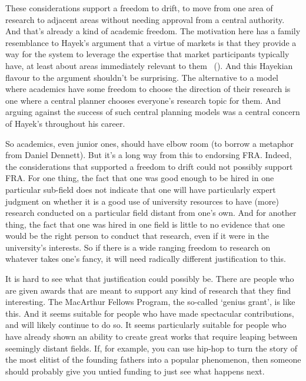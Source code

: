 \documentclass[
  10pt,
  letterpaper,
  DIV=11,
  numbers=noendperiod,
  twoside]{scrartcl}
\begin{document}
These considerations support a freedom to drift, to move from one area
of research to adjacent areas without needing approval from a central
authority. And that's already a kind of academic freedom. The motivation
here has a family resemblance to Hayek's argument that a virtue of
markets is that they provide a way for the system to leverage the
expertise that market participants typically have, at least about areas
immediately relevant to them ~().
And this Hayekian flavour to the argument shouldn't be surprising. The
alternative to a model where academics have some freedom to choose the
direction of their research is one where a central planner chooses
everyone's research topic for them. And arguing against the success of
such central planning models was a central concern of Hayek's throughout
his career.

So academics, even junior ones, should have elbow room (to borrow a
metaphor from Daniel Dennett). But it's a long way from this to
endorsing FRA. Indeed, the considerations that supported a freedom to
drift could not possibly support FRA. For one thing, the fact that one
was good enough to be hired in one particular sub-field does not
indicate that one will have particularly expert judgment on whether it
is a good use of university resources to have (more) research conducted
on a particular field distant from one's own. And for another thing, the
fact that one was hired in one field is little to no evidence that one
would be the right person to conduct that research, even if it were in
the university's interests. So if there is a wide ranging freedom to
research on whatever takes one's fancy, it will need radically different
justification to this.

It is hard to see what that justification could possibly be. There are
people who are given awards that are meant to support any kind of
research that they find interesting. The MacArthur Fellows Program, the
so-called `genius grant', is like this. And it seems suitable for people
who have made spectacular contributions, and will likely continue to do
so. It seems particularly suitable for people who have already shown an
ability to create great works that require leaping between seemingly
distant fields. If, for example, you can use hip-hop to turn the story
of the most elitist of the founding fathers into a popular phenomenon,
then someone should probably give you untied funding to just see what
happens next.
\end{document}
